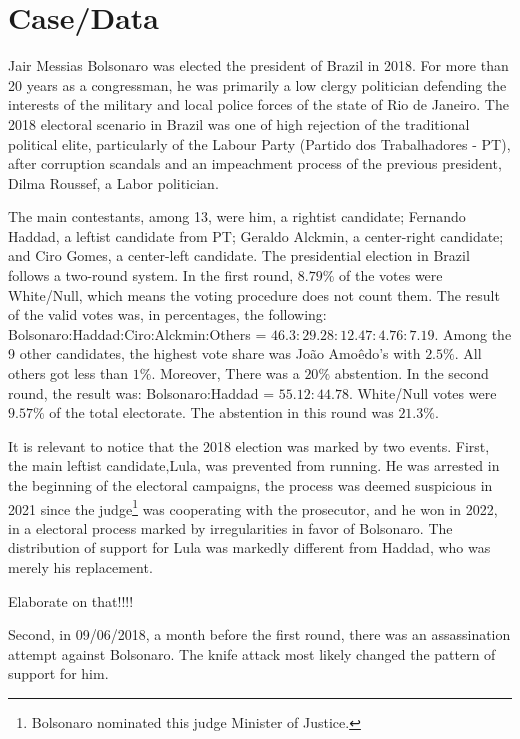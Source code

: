 \documentclass[hidelinks,11pt]{article}
\begin{document}
\section{Case/Data}

Jair Messias Bolsonaro was elected the president of Brazil in 2018. For more
than 20 years as a congressman, he was primarily a low clergy politician
defending the interests of the military and local police forces of the state of
Rio de Janeiro. The 2018 electoral scenario in Brazil was one of high rejection
of the traditional political elite, particularly of the Labour Party (Partido
dos Trabalhadores - PT), after corruption scandals and an impeachment process of
the previous president, Dilma Roussef, a Labor politician.


The main contestants, among 13, were him, a rightist candidate; Fernando Haddad,
a leftist candidate from PT; Geraldo Alckmin, a center-right candidate; and Ciro
Gomes, a center-left candidate. The presidential election in Brazil follows a
two-round system. In the first round, \(8.79\%\) of the votes were White/Null,
which means the voting procedure does not count them. The result of the valid
votes was, in percentages, the following: Bolsonaro:Haddad:Ciro:Alckmin:Others =
\(46.3:29.28:12.47:4.76:7.19 \). Among the 9 other candidates, the highest vote
share was Jo{\~a}o Amo{\^e}do's with \(2.5\%\). All others got less than
\(1\%\). Moreover, There was a \(20\%\) abstention. In the second round, the
result was: Bolsonaro:Haddad = \(55.12 : 44.78 \). White/Null votes were
\(9.57\%\) of the total electorate. The abstention in this round was \(21.3\%\).

It is relevant to notice that the 2018 election was marked by two events. First,
the main leftist candidate,Lula, was prevented from running. He was arrested in
the beginning of the electoral campaigns, the process was deemed suspicious in
2021 since the judge\footnote{Bolsonaro nominated this judge Minister of
  Justice.} was cooperating with the prosecutor, and he won in 2022, in a
electoral process marked by irregularities in favor of Bolsonaro. The
distribution of support for Lula was markedly different from Haddad, who was
merely his replacement.

\Big{\textcolor{red}{TODO}} Elaborate on that!!!!

Second, in 09/06/2018, a month before the first round, there was an
assassination attempt against Bolsonaro. The knife attack most likely changed
the pattern of support for him.
\end{document}
